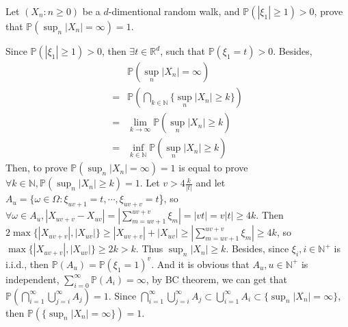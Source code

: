 \documentclass{ctexart}
\begin{document}
\begin{problem}\label{pro:2}
  Let \((X_n:n \geq 0)\) be a \(d\)-dimentional random walk, and \(\mathbb{P}(|\xi_1| \geq 1)>0\),
  prove that \(\mathbb{P}(\sup_{n}|X_n|=\infty)=1\).
\end{problem}
\begin{solution}
  Since \(\mathbb{P}(|\xi_1| \geq 1)>0\), then \(\exists t \in \mathbb{R}^d\), such that \(\mathbb{P}(\xi_1=t) > 0\).
  Besides,
  \begin{equation}
    \begin{aligned}
        & \mathbb{P}(\sup_{n} |X_n|= \infty)                             \\
      = & \mathbb{P}(\bigcap_{k \in \mathbb{N}}\{\sup_n |X_n| \geq k\} ) \\
      = & \lim_{k \to \infty}\mathbb{P}(\sup_n |X_n| \geq k)             \\
      = & \inf_{k \in \mathbb{N}} \mathbb{P}(\sup_n |X_n| \geq k)
    \end{aligned}
  \end{equation}
  Then, to prove \(\mathbb{P}(\sup_n |X_n| = \infty) = 1\) is equal to prove
  \(\forall k \in \mathbb{N}, \mathbb{P}(\sup_n |X_n| \geq k) =1\).
  Let \(v > 4 \frac{k}{|t|}\) and let \(A_u = \{\omega \in \Omega: \xi_{uv+1}=t,\cdots,\xi_{uv+v}=t\)\},
  so \(\forall \omega \in A_u, |X_{uv+v}-X_{uv}|=|\sum_{m = uv+1}^{uv+v}\xi_m|=|vt|=v|t| \geq 4k\).
  Then \(2\max\{|X_{uv + v}|,|X_{uv}|\} \geq |X_{uv+v}| + |X_{uv}| \geq |\sum_{m = uv + 1}^{uv + v} \xi_m| \geq 4k\),
  so \(\max \{|X_{uv + v}|, |X_{uv}|\} \geq 2k >k\).
  Thus \(\sup_n |X_n| \geq k\).
  Besides, since \(\xi_i, i \in \mathbb{N}^+\) is i.i.d., then \(\mathbb{P}(A_u) = \mathbb{P}(\xi_1=1)^v\).
  And it is obvious that \(A_u, u \in \mathbb{N}^+\) is independent, \(\sum_{i=0}^{\infty}\mathbb{P}(A_i)=\infty\),
  by BC theorem, we can get that \(\mathbb{P}(\bigcap_{i=1}^{\infty}\bigcup_{j=i}^{\infty}A_j)=1\).
  Since \(\bigcap_{i=1}^{\infty}\bigcup_{j=i}^{\infty}A_j \subset \bigcup_{i=1}^{\infty}A_i \subset \{\sup_n |X_n| = \infty\}\),
  then \(\mathbb{P}(\{\sup_n |X_n| = \infty\})=1\).

\end{solution}
\end{document}
